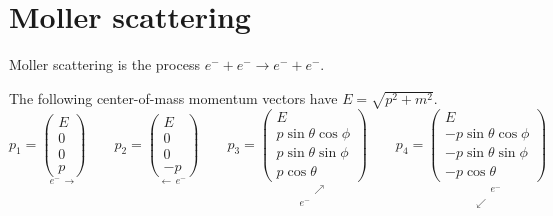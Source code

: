 

\section*{Moller scattering}

Moller scattering is the process $e^-+e^-\rightarrow e^-+e^-$.

\begin{center}
\end{center}

The following center-of-mass momentum vectors have $E=\sqrt{p^2+m^2}$.
\begin{equation*}
p_1=\underset{e^- \, \longrightarrow}
{\begin{pmatrix}E\\0\\0\\p\end{pmatrix}}
\qquad
p_2=\underset{\longleftarrow \, e^-}
{\begin{pmatrix}E\\0\\0\\-p\end{pmatrix}}
\qquad
p_3=\underset{\substack{\phantom{e^-} \, \nearrow\\e^- \, \phantom{\nearrow}}}
{\begin{pmatrix}
E\\
p\sin\theta\cos\phi\\
p\sin\theta\sin\phi\\
p\cos\theta
\end{pmatrix}}
\qquad
p_4=\underset{\substack{\phantom{\swarrow} \, e^-\\\swarrow \, \phantom{e^-}}}
{\begin{pmatrix}
E\\
-p\sin\theta\cos\phi\\
-p\sin\theta\sin\phi\\
-p\cos\theta
\end{pmatrix}}
\end{equation*}

